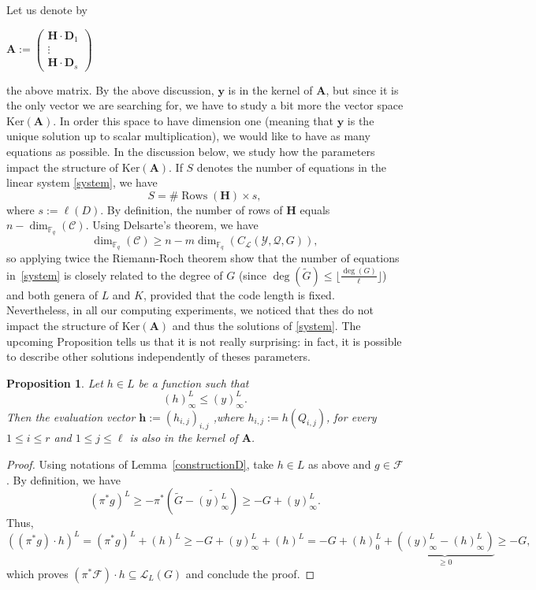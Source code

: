 \documentclass[10pt]{article}
\newtheorem{prop1}[thm]{Proposition}
\theoremstyle{definition}
\theoremstyle{definition}
\theoremstyle{definition}
\newcommand{\cd}{\cdot}
\newcommand{\Fq}{\mathbb{F}_q}
\newcommand{\su}{\subseteq}
\newcommand{\Y}{\mathcal{Y}}
\newcommand{\QR}{\mathcal{Q}}
\newcommand{\calL}{\mathcal{L}}
\begin{document}
Let us denote by
\begin{center}
$\mathbf{A} := \begin{pmatrix}
\mathbf{H} \cd \mathbf{D}_1 \\
\vdots \\
\mathbf{H} \cd \mathbf{D}_s
\end{pmatrix}
$
\end{center}
the above matrix. By the above discussion, $\mathbf{y}$ is in the kernel of $\mathbf{A}$, but since it is the only vector we are searching for, we have to study a bit more the vector space $\mathrm{Ker}(\mathbf{A})$. In order this space to have dimension one (meaning that $\mathbf{y}$ is the unique solution up to scalar multiplication), we would like to have as many equations as possible. In the discussion below, we study how the parameters impact the structure of $\mathrm{Ker}(\mathbf{A})$.
If $S$ denotes the number of equations in the linear system \eqref{system}, we have 
\[S = \#\operatorname{Rows}(\mathbf{H}) \times s,\]
where $s := \ell( D)$. By definition, the number of rows of $\mathbf{H}$ equals $n-\dim_{\Fq}(\mathcal{C})$. Using Delsarte's theorem, we have
\[\dim_{\Fq}(\mathcal{C}) \geq n-m\dim_{\Fq}(C_{\mathcal{L}}(\Y,\QR,G)),\]
so applying twice the Riemann-Roch theorem show that the number of equations in~\eqref{system} is closely related to the degree of $G$ (since $\deg(\tilde{G}) \leq \lfloor \frac{\deg(G)}{\ell} \rfloor$) and both genera of $L$ and $K$, provided that the code length is fixed. \\
Nevertheless, in all our computing experiments, we noticed that thes do not impact the structure of $\mathrm{Ker}(\mathbf{A})$ and thus the solutions of \eqref{system}. The upcoming Proposition tells us that it is not really surprising: in fact, it is possible to describe other solutions independently of theses parameters.
\color{black}


\begin{prop1} \label{othersolutions}
Let $h \in L$ be a function such that 
\[ (h)^L_{\infty} \leq (y)^L_{\infty}.\]
 Then the evaluation vector $\mathbf{h}  := (h_{i,j})_{i,j}$ ,where $h_{i,j} := h(Q_{i,j})$, for every $1 \leq i \leq r$ and $1 \leq j \leq \ell$ is also in the kernel of $\mathbf{A}$.
\end{prop1}

\begin{proof}
Using notations of Lemma~\ref{constructionD}, take $h \in L$ as above and $g \in \mathcal{F}$. By definition, we have 
\[(\pi^*g)^L \geq -\pi^*\left(\tilde{G}-\widetilde{(y)^L_{\infty}}\right) \geq - G + (y)^L_{\infty}.\]
Thus, 
\[((\pi^*g) \cd h)^L = (\pi^*g)^L  + (h)^L \geq -G + (y)^L_{\infty}+(h)^L = -G + (h)^L_0 + \underbrace{((y)^L_{\infty}-(h)^L_{\infty})}_{\geq 0} \geq -G,\]
which proves $(\pi^*\mathcal{F})\cd h \su \calL_L(G)$ and conclude the proof.
\end{proof}
\end{document}
